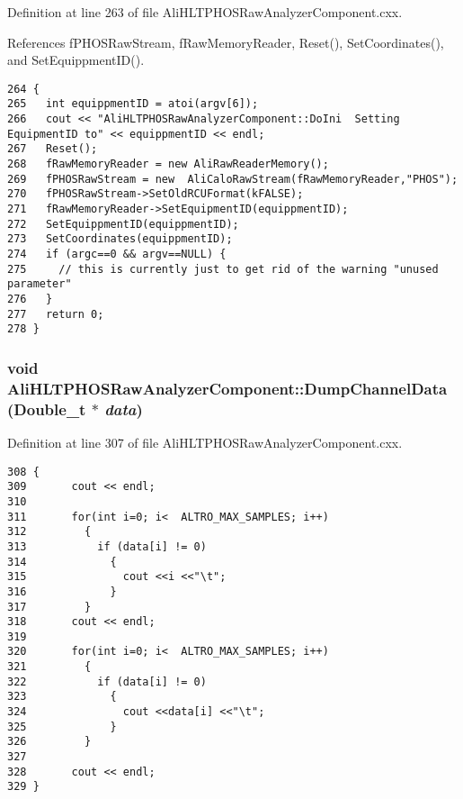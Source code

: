 Definition at line 263 of file Ali\-HLTPHOSRaw\-Analyzer\-Component.cxx.

References f\-PHOSRaw\-Stream, f\-Raw\-Memory\-Reader, Reset(), Set\-Coordinates(), and Set\-Equippment\-ID().

\footnotesize\begin{verbatim}264 {
265   int equippmentID = atoi(argv[6]);
266   cout << "AliHLTPHOSRawAnalyzerComponent::DoIni  Setting EquipmentID to" << equippmentID << endl;
267   Reset();
268   fRawMemoryReader = new AliRawReaderMemory();
269   fPHOSRawStream = new  AliCaloRawStream(fRawMemoryReader,"PHOS");
270   fPHOSRawStream->SetOldRCUFormat(kFALSE);
271   fRawMemoryReader->SetEquipmentID(equippmentID); 
272   SetEquippmentID(equippmentID);
273   SetCoordinates(equippmentID);
274   if (argc==0 && argv==NULL) {
275     // this is currently just to get rid of the warning "unused parameter"
276   }
277   return 0;
278 }
\end{verbatim}\normalsize 


\subsubsection{\setlength{\rightskip}{0pt plus 5cm}void Ali\-HLTPHOSRaw\-Analyzer\-Component::Dump\-Channel\-Data (Double\_\-t $\ast$ {\em data})}\label{classAliHLTPHOSRawAnalyzerComponent_AliHLTPHOSRawAnalyzerPeakFinderComponenta9}




Definition at line 307 of file Ali\-HLTPHOSRaw\-Analyzer\-Component.cxx.

\footnotesize\begin{verbatim}308 {
309       cout << endl;
310       
311       for(int i=0; i<  ALTRO_MAX_SAMPLES; i++)
312         {
313           if (data[i] != 0)
314             {
315               cout <<i <<"\t";
316             }
317         }
318       cout << endl;
319       
320       for(int i=0; i<  ALTRO_MAX_SAMPLES; i++)
321         {
322           if (data[i] != 0)
323             {
324               cout <<data[i] <<"\t";
325             }
326         }
327       
328       cout << endl;
329 }
\end{verbatim}\normalsize 


